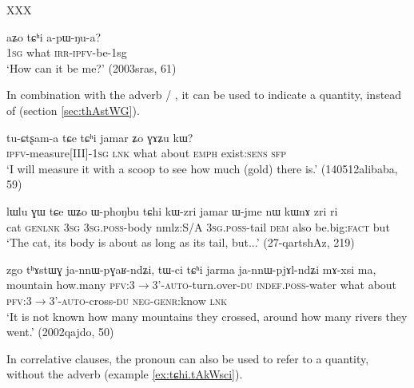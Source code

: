 XXX

\begin{exe}
\ex \label{ex:tChi.Zo.tuwGBzu}
\gll  aʑo tɕʰi a-pɯ-ŋu-a? \\
\textsc{1sg} what \textsc{irr-ipfv}-be-1sg \\
\glt `How can it be me?' (2003sras, 61)
\end{exe}  


In combination with the adverb  / , it can be used to indicate a quantity, instead of  (section \ref{sec:thAstWG}).

\begin{exe}
\ex \label{ex:tChi.jamar}
\gll tu-ɕtʂam-a tɕe tɕʰi jamar ʑo ɣɤʑu kɯ? \\
\textsc{ipfv}-measure[III]-\textsc{1sg} \textsc{lnk} what about \textsc{emph} exist:\textsc{sens} \textsc{sfp} \\
\glt `I will measure it with a scoop to see how much (gold) there is.' (140512alibaba, 59)
\end{exe}  

\begin{exe}
\ex \label{ex:tChi.kWzri}
\gll lɯlu ɣɯ tɕe ɯʑo ɯ-phoŋbu tɕhi kɯ-zri jamar ɯ-jme nɯ kɯnɤ zri ri \\
cat \textsc{gen}\textsc{lnk} \textsc{3sg} \textsc{3sg.poss}-body nmlz:S/A \textsc{3sg.poss}-tail \textsc{dem} also be.big:\textsc{fact} but \\
\glt `The cat, its body is about as long as its tail, but...' (27-qartshAz, 219)
\end{exe}  


\begin{exe}
\ex
\gll  zgo 	tʰɤstɯɣ 	ja-nnɯ-pɣaʁ-ndʑi, 	tɯ-ci 	tɕʰi 	jarma 	ja-nnɯ-pjɤl-ndʑi 	mɤ-xsi 	ma,       \\
 mountain how.many \textsc{pfv}:3$\rightarrow$3'-\textsc{auto}-turn.over-\textsc{du} \textsc{indef.poss}-water what about \textsc{pfv}:3$\rightarrow$3'-\textsc{auto}-cross-\textsc{du} \textsc{neg-genr}:know \textsc{lnk} \\
\glt `It is not known how many mountains they crossed, around how many rivers they went.'  (2002qajdo, 50)
\end{exe}  

In correlative clauses, the pronoun  can also be used to refer to a quantity, without the adverb  (example \ref{ex:tɕhi.tAkWsci}).

